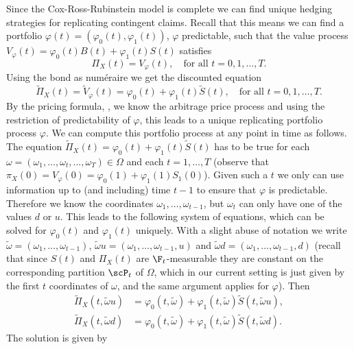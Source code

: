 Since the Cox-Ross-Rubinstein model is complete we can find unique hedging strategies for replicating contingent claims. Recall that this means we can find a portfolio $\varphi(t) = (\varphi_0(t), \varphi_1(t))$, $\varphi$ predictable, such that the value process $V_\varphi(t) = \varphi_0(t)B(t) + \varphi_1(t)S(t)$ satisfies
\[
	\Pi_X(t) = V_\varphi(t), \quad \text{for all } t = 0, 1, \dots, T.
\]
Using the bond as num\'{e}raire we get the discounted equation
\[
	\tilde{\Pi}_X(t) = \tilde{V}_\varphi(t) = \varphi_0(t) + \varphi_1(t)\tilde{S}(t), \quad \text{for all } t = 0, 1, \dots, T.
\]
By the pricing formula, , we know the arbitrage price process and using the restriction of predictability of $\varphi$, this leads to a unique replicating portfolio process $\varphi$. We can compute this portfolio process at any point in time as follows. The equation $\tilde{\Pi}_X(t) = \varphi_0(t) + \varphi_1(t)\tilde{S}(t)$ has to be true for each $\omega = (\omega_1, \dots, \omega_t, \dots, \omega_T) \in \Omega$ and each $t = 1, \dots, T$ (observe that $\pi_X(0) = V_\varphi(0) = \varphi_0(1) + \varphi_1(1)S_1(0)$). Given such a $t$ we only can use information up to (and including) time $t-1$ to ensure that $\varphi$ is predictable. Therefore we know the coordinates $\omega_1, \dots, \omega_{t-1}$, but $\omega_t$ can only have one of the values $d$ or $u$. This leads to the following system of equations, which can be solved for $\varphi_0(t)$ and $\varphi_1(t)$ uniquely. With a slight abuse of notation we write $\tilde{\omega} = (\omega_1, \dots, \omega_{t-1})$, $\tilde{\omega}u = (\omega_1, \dots, \omega_{t-1}, u)$ and $\tilde{\omega}d = (\omega_1, \dots, \omega_{t-1}, d)$ (recall that since $S(t)$ and $\Pi_X(t)$ are $\F_t$-measurable they are constant on the corresponding partition $\scP_t$ of $\Omega$, which in our current setting is just given by the first $t$ coordinates of $\omega$, and the same argument applies for $\varphi$). Then
\begin{align*}
	\tilde{\Pi}_X(t, \tilde{\omega}u) & = \varphi_0(t, \tilde{\omega}) + \varphi_1(t, \tilde{\omega})\tilde{S}(t, \tilde{\omega}u), \\
	\tilde{\Pi}_X(t, \tilde{\omega}d) & = \varphi_0(t, \tilde{\omega}) + \varphi_1(t, \tilde{\omega})\tilde{S}(t, \tilde{\omega}d).
\end{align*}
The solution is given by
